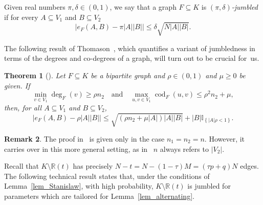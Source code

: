 \documentclass[12pt,reqno]{amsart}
\newcommand{\R} {\mathbb R}
\newcommand{\I} {\mathbb I}
\newcommand{\cod}{\operatorname{cod}}
\newtheorem{theorem}{Theorem}
\theoremstyle{definition}
\newtheorem{remark}[theorem]{Remark}
\begin{document}
Given real numbers $\pi,\delta\in(0,1)$, we say that a graph $F \subseteq K$ is \emph{$(\pi, \delta)$-jumbled} if
for every $A \subseteq V_1$ and $B \subseteq V_2$
\begin{equation*}
  |e_F(A,B) - \pi|A||B|| \le \delta \sqrt{N|A||B|}.
\end{equation*}

The following result of Thomason~\cite[Theorem 2]{T89}, which quantifies a variant of jumbledness in terms of the degrees and co-degrees of a graph, will turn out to be crucial for~us.


\begin{theorem}[\cite{T89}]
  \label{thm_Thomason}
  Let $F \subseteq K$ be a bipartite graph and  $\rho \in (0,1)$ and $\mu \ge 0$ be given. If
	\begin{equation}
\label{eq_Thomason_assumption}
		\min_{v \in V_1} \deg_F(v) \ge \rho n_2\quad\text{and}\quad\max_{u,v\in V_1} \cod_F(u,v) \le \rho^2n_2 + \mu,
	\end{equation}
then, for all $A \subseteq V_1$ and $B \subseteq V_2$,
	\begin{equation*}
		|e_F(A,B) - \rho|A||B|| \le \sqrt{(\rho n_2 + \mu |A|)|A||B|} + |B|\I_{\left\{ |A|\rho < 1 \right\}}.
	\end{equation*}
\end{theorem}


\begin{remark}\rm
	The proof in~\cite{T89} is given only in the case $n_1 = n_2 = n$.
 However, it carries over in this more general setting, as in~\cite{T89} $n$ always refers to $|V_2|$.
\end{remark}

Recall that $K\setminus \R(t)$ has precisely $N - t = N - (1-\tau)M = (\tau p + q)N$ edges.
The following technical result states that, under the conditions of Lemma~\ref{lem_Stanislaw}, with high probability, $K\setminus \R(t)$ is jumbled for parameters which are tailored for Lemma~\ref{lem_alternating}.
\end{document}
